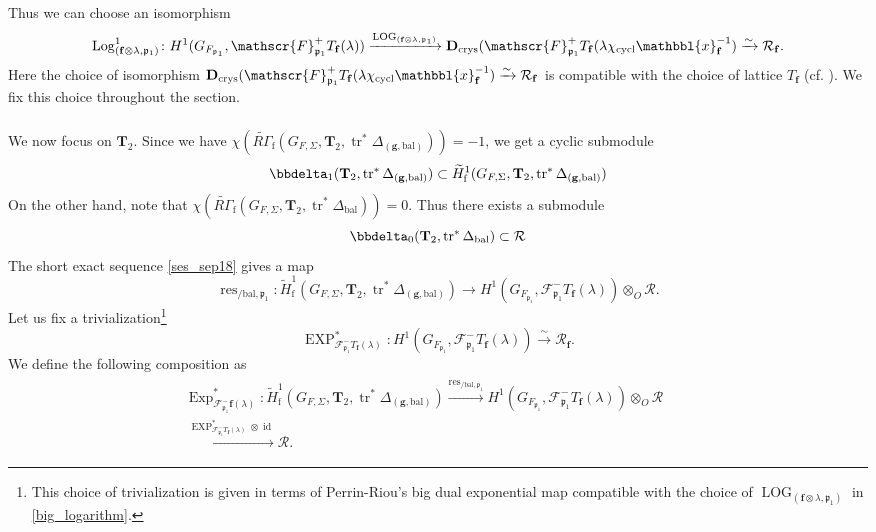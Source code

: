 \documentclass[10pt]{amsart}
\numberwithin{equation}{section}
\theoremstyle{definition}
\theoremstyle{remark} %
\newcommand{\bbl}{\mathbbl}
\newcommand{\mbf}{\mathbf}
\newcommand{\Exp}{\operatorname{Exp}}
\newcommand{\Log}{\operatorname{Log}}
\DeclareMathOperator{\LOG}{LOG}
\DeclareMathOperator{\res}{res}
\renewcommand{\b}{\mathrm{bal}}
\newcommand{\f}{\mathbf{f}}
\newcommand{\scrF}{\mathscr{F}}
\newcommand{\g}{\mathbf{g}}
\newcommand{\p}{\mathfrak{p}}
\newcommand{\R}{\mathcal{R}}
\newcommand{\T}{\mathbf{T}}
\begin{document}
		Thus we can choose an isomorphism
		\begin{align}
			\Log_{(\f \otimes \lambda,\p_1)}^1 \colon H^1(G_{F_{\p_1}}, \scrF^+_{\p_1} T_\f(\lambda)) \xrightarrow{\LOG_{(\f \otimes \lambda,\p_1)}} \mbf D_{\rm crys} (\scrF^+_{\p_1} T_\f(\lambda\chi_{\mathrm{cycl}}\bbl{x}_\f^{-1}) \xrightarrow{\sim} \R_\f.
		\end{align}
		Here the choice of isomorphism $ \mbf D_{\rm crys} (\scrF^+_{\p_1} T_\f(\lambda\chi_{\mathrm{cycl}}\bbl{x}_\f^{-1}) \xrightarrow{\sim} \R_\f $  is compatible with the choice of lattice $ T_\f $ (cf. \cite[Proposition 10.1.1]{kings_loeffler_zerbes17}). We fix this choice throughout the section. 
		\subsubsection{}
		\label{6.1.3}
		We now focus on $\T_{2} $. Since we have $ \chi(\widetilde{R\Gamma}_{\mathrm{f}}(G_{F,\Sigma}, \T_2, \operatorname{tr}^*\Delta_{(\g,\b)})) = -1 $, we get a cyclic submodule
		$$ \bbdelta_1(\T_2, \operatorname{tr}^*\Delta_{(\g,\b)}) \subset  \widetilde{H}^1_{\mathrm{f}}(G_{F,\Sigma}, \T_2, \operatorname{tr}^*\Delta_{(\g,\b)}) $$
		On the other hand, note that $ \chi(\widetilde{R\Gamma}_{\mathrm{f}}(G_{F,\Sigma},\T_2, \operatorname{tr}^*\Delta_{\mathrm{bal}})) = 0 $.
		Thus there exists a submodule 
		$$ \bbdelta_0(\T_2, \operatorname{tr}^*\Delta_{\mathrm{bal}}) \subset \R$$
		The short exact sequence \ref{ses_sep18} gives a map
		\begin{equation}
			\res_{/\mathrm{bal}, \p_1} \colon \widetilde{H}^1_{\mathrm{f}}(G_{F,\Sigma}, \T_2, \operatorname{tr}^*\Delta_{(\g,\b)})\rightarrow H^1(G_{F_{\p_1}},\scrF^-_{\p_1} T_{\f}(\lambda)) \otimes_O \R.
		\end{equation}
		Let us fix a trivialization\footnote{This choice of trivialization is given in terms of Perrin-Riou's big dual exponential map compatible with the choice of $ \LOG_{(\f \otimes \lambda,\p_1)} $ in \eqref{big_logarithm}.} 
		$$ \operatorname{EXP}^*_{\scrF^-_{\p_1} T_{\f}(\lambda)} \colon H^1(G_{F_{\p_1}},\scrF^-_{\p_1} T_{\f}(\lambda)) \xrightarrow{\sim} \R_\f.$$
		We define the following composition as
		\begin{align}
			\begin{aligned}
				\Exp_{\scrF^-_{\p_1}\f (\lambda)}^* \colon \widetilde{H}^1_{\mathrm{f}}(G_{F,\Sigma}, \T_2, \operatorname{tr}^*\Delta_{(\g,\b)})\xrightarrow{\res_{/\mathrm{bal}, \p_1}} H^1(G_{F_{\p_1}},\scrF^-_{\p_1} T_{\f}(\lambda)) \otimes_O \R \qquad \\
				\xrightarrow{\operatorname{EXP}^*_{\scrF^-_{\p_1} T_{\f}(\lambda)} \otimes \operatorname{id}} \R.		\end{aligned}
		\end{align}
\end{document}
